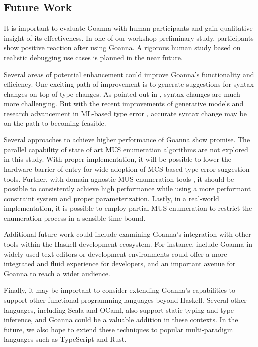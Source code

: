 \subsection{Future Work}\label{sec:future-work}
  	It is important to evaluate Goanna with human participants  and gain qualitative insight of its effectiveness. In  one of our workshop preliminary study, participants show positive reaction after using Goanna. A rigorous human study based on realistic debugging use cases is planned in the near future.   
  	
  	
    Several areas of potential enhancement could improve Goanna's functionality and efficiency. One exciting path of improvement is to generate suggestions for syntax changes on top of type changes. As pointed out in \cite{Chen2014-dz}, syntax changes are much more challenging. But with the recent improvements of generative models and research advancement in ML-based type error \cite{Seidel2017-uf}, accurate syntax change may be on the path to becoming feasible.

    Several approaches to achieve higher performance of Goanna show promise. The parallel capability of state of art MUS enumeration \cite{Zhao2016-bu} algorithms are not explored in this study. With proper implementation, it will be possible to lower the hardware barrier of entry for wide adoption of MCS-based type error suggestion tools. Further, with domain-agnostic MUS enumeration tools \cite{Bendik2020-pz}, it should be possible to consistently achieve high performance while using a more performant constraint system and proper parameterization. Lastly, in a real-world implementation, it is possible to employ partial MUS enumeration \cite{Previti2013-mr,Liffiton2016-xi} to restrict the enumeration process in a sensible time-bound.

    Additional future work could include examining Goanna's integration with other tools within the Haskell development ecosystem. For instance, include Goanna in widely used text editors or development environments could offer a more integrated and fluid experience for developers, and an important avenue for Goanna to reach a wider audience. 

    Finally, it may be important to consider extending Goanna's capabilities to support other functional programming languages beyond Haskell. Several other languages, including Scala and OCaml, also support static typing and type inference, and Goanna could be a valuable addition in these contexts. In the future, we also hope to extend these techniques to popular multi-paradigm languages such as TypeScript and Rust.


